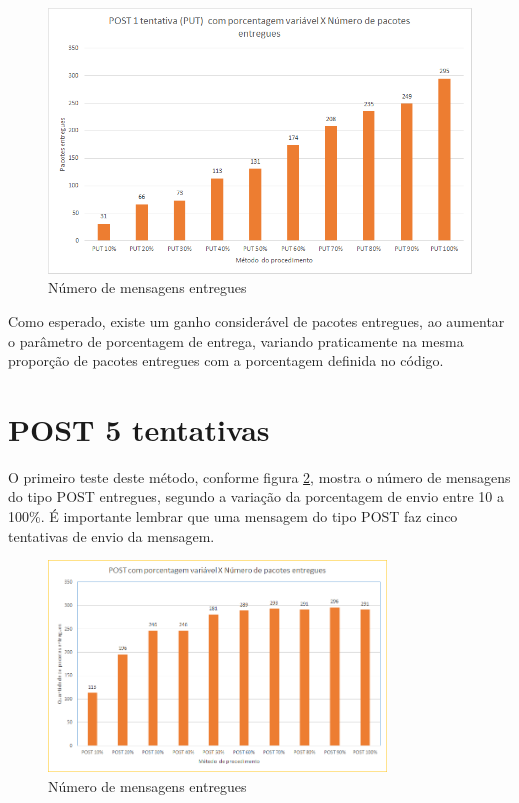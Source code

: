 \begin{figure}[!htb]
	\centering
	\includegraphics[width=.8\textwidth]{../imagens/PUTxNumentregues}
	\caption{Número de mensagens entregues}
	\label{fig:put_num_entregues}
\end{figure}

Como esperado, existe um ganho considerável de pacotes entregues, ao aumentar o parâmetro de porcentagem de entrega, variando praticamente na mesma proporção de pacotes entregues com a porcentagem definida no código.

\section{POST 5 tentativas}

O primeiro teste deste método, conforme figura \ref{fig:post_num_entregues}, mostra o número de mensagens do tipo POST entregues, segundo a variação da porcentagem de envio entre 10 a 100\%.
É importante lembrar que uma mensagem do tipo POST faz cinco tentativas de envio da mensagem.

\begin{figure}[!htb]
	\centering
	\includegraphics[width=0.8\textwidth]{../imagens/POSTxNumEntregues}
	\caption{Número de mensagens entregues}
	\label{fig:post_num_entregues}
\end{figure}
\hfill \break
\hfill \break
\hfill \break
\hfill \break
\hfill \break
\hfill \break
\hfill \break
\hfill \break
\hfill \break
\hfill \break

